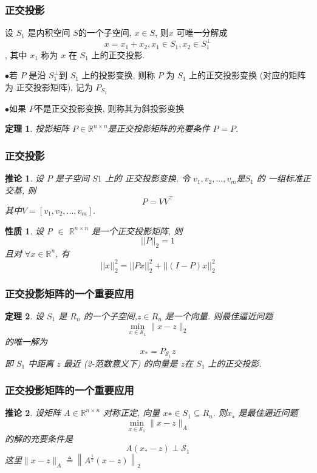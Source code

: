 \documentclass[notheorems,serif]{beamer}
\newcommand{\hei}[1]{{\HEI#1}}
\newtheorem{theorem}{\hei{定理}}
\newtheorem{property}{\hei{性质}}
\newtheorem{corollary}{\hei{推论}}
\begin{document}
\begin{frame}
\frametitle{正交投影}
设 $S_1$ 是内积空间 $S $的一个子空间, $x \in S$, 则$x$ 可唯一分解成
$$x = x_1 + x_2, x_1 \in S_1, x_2 \in S^{⊥}_1$$
,
其中 $x_1$ 称为 $x$ 在 $S_1$ 上的正交投影.

\qquad$\bullet$若 $P$ 是沿 $S^{⊥}_1 $到 $S_1$ 上的投影变换, 则称 $P$ 为 $S_1$ 上的正交投影变换
(对应的矩阵为 正交投影矩阵), 记为 $P_{S_1}$

\qquad$\bullet$如果 $P $不是正交投影变换, 则称其为斜投影变换

\begin{theorem}
	投影矩阵 $P \in\mathbb{R}^{n×n}$是正交投影矩阵的充要条件 $P^{} = P$.
\end{theorem}
\end{frame}

\begin{frame}
\frametitle{正交投影}

\begin{corollary}
	设 $P$ 是子空间 $S1$ 上的 正交投影变换. 令 $v_1, v_2, . . . , v_m $是$ S_1$ 的
	一组标准正交基, 则
	$$
	P=V V^{\top}
	$$
	其中$ V = [v_1, v_2, . . . , v_m].$
\end{corollary}
\begin{property}
	设 P $\in$ $\mathbb{R}^{n×n}$ 是一个正交投影矩阵, 则
	$$
	||P||_{2}=1
	$$
	且对 $∀ x \in \mathbb{R}^n$, 有
	$$
	||x||_{2}^{2}=||P x||_{2}^{2}+||(I-P) x||_{2}^{2}
	$$
\end{property}
\end{frame}

\begin{frame}
\frametitle{正交投影矩阵的一个重要应用}

\begin{theorem}
	设 $S_1$ 是 $R_n$ 的一个子空间,$ z \in R_n$ 是一个向量. 则最佳逼近问题
	$$
	\min _{x \in \mathcal{S}_{1}}\|x-z\|_{2}
	$$
	的唯一解为
	$$
	x_{*}=P_{\mathcal{S}_{1}} z
	$$
	即 $S_1$ 中距离 $z$ 最近 (2-范数意义下) 的向量是 $z $在 $S
	_1$ 上的正交投影.
\end{theorem}
\end{frame}

\begin{frame}
\frametitle{正交投影矩阵的一个重要应用}

\begin{corollary}
	设矩阵 $A \in \mathbb{R}^{n×n}$ 对称正定, 向量 $x∗ \in S_1 ⊆ R_n.$ 则$ x_∗$ 是最佳逼近问题
	$$
	\min _{x \in \mathcal{S}_{1}}\|x-z\|_{A}
	$$
	的解的充要条件是
	$$
	A\left(x_{*}-z\right) \perp \mathcal{S}_{1}
	$$
	这里$\|x-z\|_{A} \triangleq\left\|A^{\frac{1}{2}}(x-z)\right\|_{2}$
\end{corollary}
\end{frame}
\end{document}
